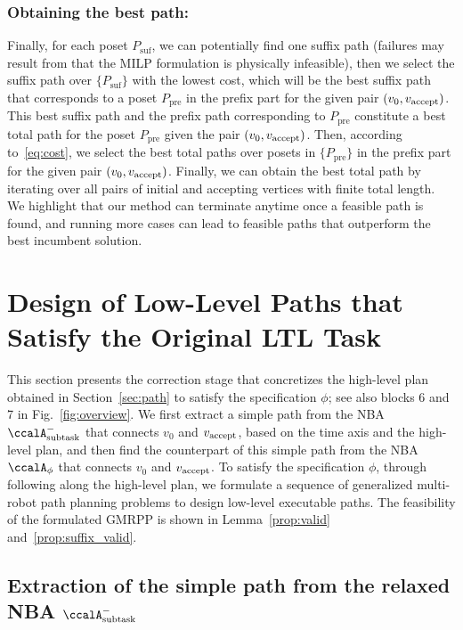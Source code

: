 \documentclass[Afour,sageh,times]{sagej}
\newcommand{\auto}[1]{\ccalA_{\textup{#1}}}
\newcommand{\autop}{\ccalA_{\phi}}
\newcommand{\vertex}[1]{v_{\textup{#1}}}
\begin{document}
{{\subsubsection{Obtaining the best path:}
Finally, for each poset $P_{\text{suf}}$, we can potentially find one suffix path (failures may result from that the MILP formulation is physically infeasible), then we select the suffix path over $\{P_{\text{suf}}\}$ with the lowest cost, which will be the best suffix path that corresponds to a poset $P_{\text{pre}}$ in the prefix part for the given pair $(v_0, \vertex{accept})$. This best suffix path and the prefix path corresponding to $P_{\text{pre}}$ constitute a best total path for the poset $P_{\text{pre}}$ given the pair $(v_0, \vertex{accept})$. Then, according to~\eqref{eq:cost}, we select the best total paths over posets in $\{P_{\text{pre}}\}$ in the prefix part for the given pair $(v_0, \vertex{accept})$.  Finally, we can obtain the best total path by iterating over all pairs of initial and accepting vertices with finite total length. We highlight that our method can terminate anytime once a feasible path is found, and running more cases can lead to feasible paths that outperform the best incumbent solution.


  \section{Design of Low-Level Paths that Satisfy the Original LTL Task}\label{sec:solution2mrta}
  This section presents the correction stage that concretizes the high-level plan obtained in Section~\ref{sec:path} to satisfy the specification $\phi$; see also blocks 6 and 7 in Fig.~\ref{fig:overview}.
  We first extract a simple path from the NBA $\auto{subtask}^-$ that connects $v_0$ and $\vertex{accept}$, based on the time axis and the high-level plan, and then find the counterpart of this simple path from the NBA $\autop$ that connects $v_0$ and $\vertex{accept}$. To satisfy the specification $\phi$, through following along the high-level plan, we formulate a sequence of generalized multi-robot path planning problems to design low-level executable paths. The feasibility of the formulated GMRPP is shown in Lemma~\ref{prop:valid} and~\ref{prop:suffix_valid}.

\subsection{Extraction of the simple path from the relaxed NBA \upshape $\auto{subtask}^-$}\label{sec:run}

}}
\end{document}
